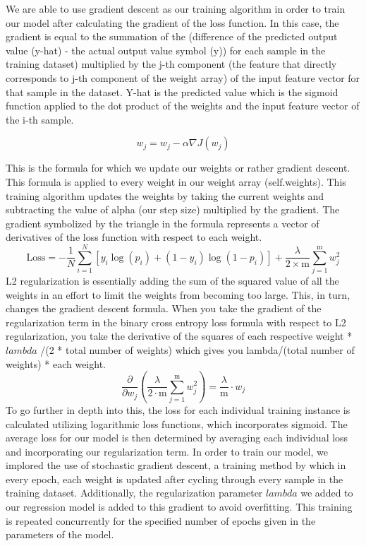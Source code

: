 \documentclass{article}
\begin{document}
\noindent We are able to use gradient descent as our training algorithm in order to train our model after calculating the gradient of the loss function. In this case, the gradient is equal to the summation of the (difference of the predicted output value (y-hat) - the actual output value symbol (y)) for each sample in the training dataset) multiplied by the j-th component (the feature that directly corresponds to j-th component of the weight array) of the input feature vector for that sample in the dataset. Y-hat is the predicted value which is the sigmoid function applied to the dot product of the weights and the input feature vector of the i-th sample. 


\[w_j = w_j - {\alpha} {\nabla} J (w_j)\]

\noindent This is the formula for which we update our weights or rather gradient descent. This formula is applied to every weight in our weight array (self.weights). This training algorithm updates the weights by taking the current weights and subtracting the value of alpha (our step size) multiplied by the gradient. The gradient symbolized by the triangle in the formula represents a vector of derivatives of the loss function with respect to each weight. 
\[\textrm{Loss} = -\frac{1}{N} \sum_{i=1}^{N} \left[ y_i \log(p_i) + (1 - y_i) \log(1 - p_i) \right] + \frac{\lambda}{2 \times \textrm{m}} \sum_{j=1}^{ \textrm{m}} w_j^2\]
L2 regularization is essentially adding the sum of the squared value of all the weights in an effort to limit the weights from becoming too large.
This, in turn, changes the gradient descent formula. When you take the gradient of the regularization term in the binary cross entropy loss formula with respect to L2 regularization, you take the derivative of the squares of each respective weight * $lambda$ /(2 * total number of weights) which gives you lambda/(total number of weights) * each weight.
\[ \frac{\partial}{\partial w_j} \left( \frac{\lambda}{2 \cdot \textrm{m}} \sum_{j=1}^{ \textrm{m}} w_j^2 \right) = \frac{\lambda}{\textrm{m}} \cdot w_j \]        
To go further in depth into this, the loss for each individual training instance is calculated utilizing logarithmic loss functions, which incorporates sigmoid. The average loss for our model is then determined by averaging each individual loss and incorporating our regularization term. In order to train our model, we implored the use of stochastic gradient descent, a training method by which in every epoch, each weight is updated after cycling through every sample in the training dataset.
Additionally, the regularization parameter $lambda$ we added to our regression model is added to this gradient to avoid overfitting. This training is repeated concurrently for the specified number of epochs given in the parameters of the model.
\end{document}
